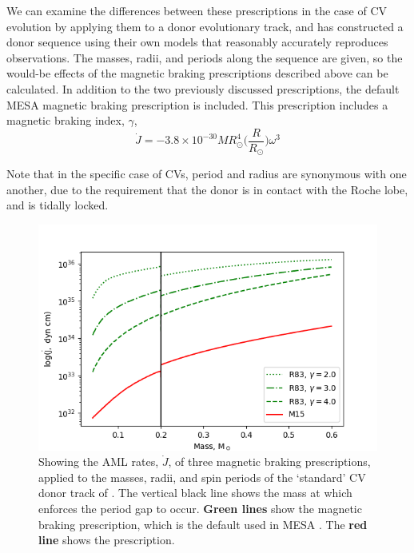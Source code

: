 We can examine the differences between these prescriptions in the case of CV evolution by applying them to a donor evolutionary track, and \citet{knigge11} has constructed a donor sequence using their own models that reasonably accurately reproduces observations. The masses, radii, and periods along the sequence are given, so the would-be effects of the magnetic braking prescriptions described above can be calculated. In addition to the two previously discussed prescriptions, the default MESA \citep{Paxton_2015} magnetic braking prescription \citep{rappaport1983} is included. This prescription includes a magnetic braking index, $\gamma$,
\begin{equation}
    \dot J = -3.8\times10^{-30} M R_\odot^4 \bigg( \frac{R}{R_\odot} \bigg) \omega^3
\end{equation}

Note that in the specific case of CVs, period and radius are synonymous with one another, due to the requirement that the donor is in contact with the Roche lobe, and is tidally locked. 

\begin{figure}
    \centering
    \includegraphics[width=\textwidth, trim={1cm 0 0 0}]{figures/introduction/rappaport_matt_magbraking.png}
    \caption{Showing the AML rates, $\dot J$, of three magnetic braking prescriptions, applied to the masses, radii, and spin periods of the `standard' CV donor track of \citet{knigge11}. The vertical black line shows the mass at which \citet{knigge11} enforces the period gap to occur. {\bf Green lines} show the \citet{rappaport1983} magnetic braking prescription, which is the default used in MESA \citep{Paxton_2015}. The {\bf red line} shows the \citet{matt2015} prescription.}
    \label{fig:introduction:rappaport garraffo matt magnetic braking}
\end{figure}

